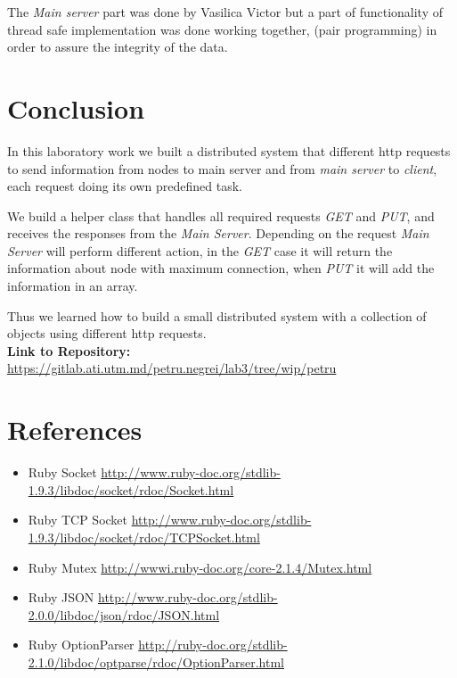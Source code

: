 \documentclass[12pt]{article}
\begin{document}
    The \textit{Main server} part was done by Vasilica Victor but a part of functionality of thread safe implementation was done working together, 
    (pair programming) in order to assure the integrity of the data.

    \section{Conclusion}

    In this laboratory work we built a distributed system that different http requests to send information from nodes to main server
    and from \textit{main server} to \textit{client}, each request doing its own predefined task.

    We build a helper class that handles all required requests \textit{GET} and \textit{PUT}, and receives the responses from the \textit{Main Server}.
    Depending on the request \textit{Main Server} will perform different action, in the \textit{GET} case it will return the information about 
    node with maximum connection, when \textit{PUT} it will add the information in an array.

    Thus we learned how to build a small distributed system with a collection of objects using different http requests. \\

    \textbf{Link to Repository: } \url{https://gitlab.ati.utm.md/petru.negrei/lab3/tree/wip/petru}


   \section{References}

   \begin{itemize}
      \item Ruby Socket \url{http://www.ruby-doc.org/stdlib-1.9.3/libdoc/socket/rdoc/Socket.html}
      \item Ruby TCP  Socket \url{http://www.ruby-doc.org/stdlib-1.9.3/libdoc/socket/rdoc/TCPSocket.html}
      \item Ruby Mutex \url{http://wwwi.ruby-doc.org/core-2.1.4/Mutex.html}
      \item Ruby JSON \url{http://www.ruby-doc.org/stdlib-2.0.0/libdoc/json/rdoc/JSON.html}
      \item Ruby OptionParser \url{http://ruby-doc.org/stdlib-2.1.0/libdoc/optparse/rdoc/OptionParser.html}
   \end{itemize}
\end{document}
